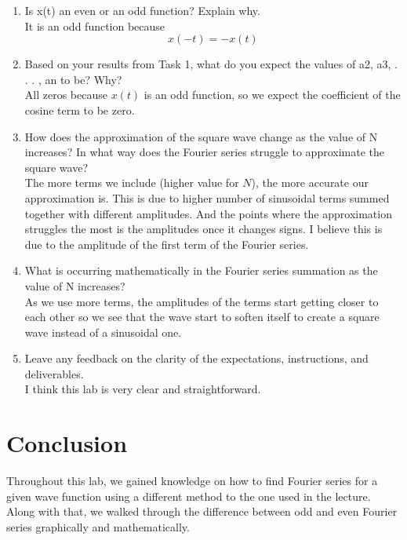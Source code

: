 \documentclass[12pt]{report}
\begin{document}
\begin{enumerate}
    \item 
    Is x(t) an even or an odd function? Explain why.\\
    It is an odd function because 
    $$x(-t)=-x(t)$$
    
    \item
    Based on your results from Task 1, what do you expect the values of a2, a3, . . . , an to be? Why?\\
    All zeros because $x(t)$ is an odd function, so we expect the coefficient of the cosine term to be zero.
    
    \item
    How does the approximation of the square wave change as the value of N increases? In what way does the Fourier series struggle to approximate the square wave?\\
    The more terms we include (higher value for $N$), the more accurate our approximation is. This is due to higher number of sinusoidal terms summed together with different amplitudes. And the points where the approximation struggles the most is the amplitudes once it changes signs. I believe this is due to the amplitude of the first term of the Fourier series.
    
    \item
    What is occurring mathematically in the Fourier series summation as the value of N increases?\\
    As we use more terms, the amplitudes of the terms start getting closer to each other so we see that the wave start to soften itself to create a square wave instead of a sinusoidal one. 
    \item
    Leave any feedback on the clarity of the expectations, instructions, and deliverables.\\
    I think this lab is very clear and straightforward.
    
\end{enumerate}

\section{Conclusion}
Throughout this lab, we gained knowledge on how to find Fourier series for a given wave function using a different method to the one used in the lecture. Along with that, we walked through the difference between odd and even Fourier series graphically and mathematically. 
\end{document}
